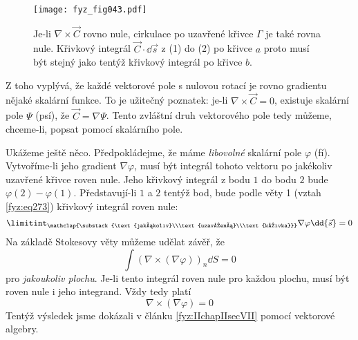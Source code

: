     \begin{figure}[ht!]  %
      \centering
      \texttt{[image: fyz\_fig043.pdf]}
      \caption{Je-li \(\nabla\times\vec{C}\) rovno nule, cirkulace po uzavřené křivce \(\Gamma\)   
        je také rovna nule. Křivkový integrál \(\vec{C}\cdot\dd{\vec{s}}\) z (1) do (2) po 
        křivce \(a\) proto musí být stejný jako tentýž křivkový integrál po křivce \(b\).}
      \label{fyz:fig043}
    \end{figure}
    Z toho vyplývá, že každé vektorové pole s nulovou rotací je rovno gradientu nějaké skalární 
    funkce. To je užitečný poznatek: je-li \(\nabla\times\vec{C}=0\), existuje skalární pole 
    \(\Psi\) (psí), že \(\vec{C}=\nabla\Psi\). Tento zvláštní druh vektorového pole tedy můžeme, 
    chceme-li, popsat pomocí skalárního pole.
    
    Ukážeme ještě něco. Předpokládejme, že máme \emph{libovolné} skalární pole \(\varphi\) (fí). 
    Vytvoříme-li jeho gradient \(\nabla\varphi\), musí být integrál tohoto vektoru po jakékoliv 
    uzavřené křivce  roven nule. Jeho křivkový integrál z bodu \(1\) do bodu \(2\) bude 
    \(\varphi(2) - \varphi(1)\). Představují-li \(1\) a \(2\) tentýž bod, bude podle věty 1 (vztah 
    \ref{fyz:eq273}) křivkový integrál roven nule:
    \begin{equation}\label{fyz:eq359}
      \limitint_{\mathclap{\substack{\text{jakákoliv}\\\text{uzavřená}\\\text{křivka}}}}
        \nabla\varphi\dd{\vec{s}} = 0
    \end{equation}
    Na základě Stokesovy věty můžeme udělat závěř, že 
    \begin{equation}\label{fyz:eq_fey_null0} 
      \int(\nabla\times(\nabla\varphi))_n\dd{S} = 0
    \end{equation} 
    pro \emph{jakoukoliv plochu}. Je-li tento integrál roven nule pro každou plochu, musí být 
    roven nule i jeho integrand. Vždy tedy platí
    \begin{equation}
      \nabla\times(\nabla\varphi) = 0
    \end{equation}
    Tentýž výsledek jsme dokázali v článku \ref{fyz:IIchapIIsecVII} pomocí vektorové algebry.      
    

